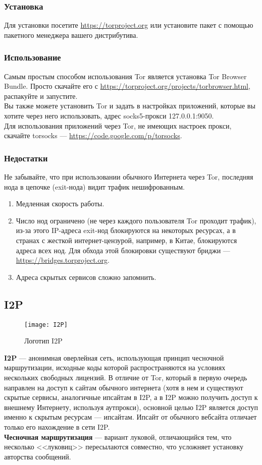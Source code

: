 \subsubsection{Установка}
Для установки посетите \url{https://torproject.org} или установите пакет с помощью пакетного менеджера вашего дистрибутива.
\subsubsection{Использование}
Самым простым способом использования Tor является установка Tor Browser Bundle. Просто скачайте его с \url{https://torproject.org/projects/torbrowser.html}, распакуйте и запустите.\\
Вы также можете установить Tor и задать в настройках приложений, которые вы хотите через него использовать, адрес socks5-прокси 127.0.0.1:9050.\\
Для использования приложений через Tor, не имеющих настроек прокси, скачайте torsocks --- \url{https://code.google.com/p/torsocks}.
\subsubsection{Недостатки}
\begin{important}
Не забывайте, что при использовании обычного Интернета через Tor, последняя нода в цепочке (exit-нода) видит трафик нешифрованным.
\end{important}
\begin{enumerate}
\item Медленная скорость работы.
\item Число нод ограничено (не через каждого пользователя Tor проходит трафик), из-за этого IP-адреса exit-нод блокируются на некоторых ресурсах, а в странах с жесткой интернет-цензурой, например, в Китае, блокируются адреса всех нод. Для обхода этой блокировки существуют бриджи --- \url{https://bridges.torproject.org}.
\item Адреса скрытых сервисов сложно запомнить.
\end{enumerate}
\subsection{I2P}
\begin{wrapfigure}[6]{r}{0.25\linewidth}
\texttt{[image: I2P]}
\caption{Логотип I2P}
\end{wrapfigure}
\textbf{I2P} --- анонимная оверлейная сеть, использующая принцип чесночной маршрутизации, исходные коды которой распространяются на условиях нескольких свободных лицензий\cite{i2p_license}. В отличие от Tor, который в первую очередь направлен на доступ к сайтам обычного интернета (хотя в нем и существуют скрытые сервисы, аналогичные ипсайтам в I2P, а в I2P можно получить доступ к внешнему Интернету, используя аутпрокси), основной целью I2P является доступ именно к скрытым ресурсам --- ипсайтам. Ипсайт от обычного вебсайта отличает только его нахождение в сети I2P.\\
\textbf{Чесночная маршрутизация} --- вариант луковой, отличающийся тем, что несколько <<луковиц>> пересылаются совместно, что усложняет установку авторства сообщений.
